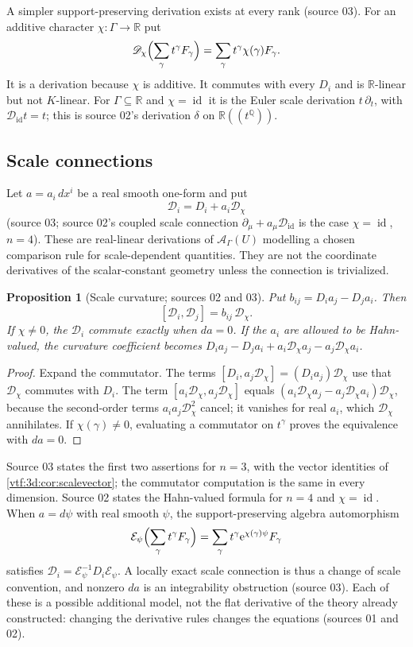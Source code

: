 \documentclass[11pt,letterpaper]{article}
\newtheorem{proposition}[theorem]{Proposition}
\theoremstyle{definition}
\theoremstyle{remark}
\newcommand{\R}{\mathbb R}\newcommand{\C}{\mathbb C}
\newcommand{\Q}{\mathbb Q}\newcommand{\N}{\mathbb N}\newcommand{\Z}{\mathbb Z}
\newcommand{\A}{\mathscr A}\newcommand{\OO}{\mathcal O}\newcommand{\mm}{\mathfrak m}
\newcommand{\id}{\operatorname{id}}\newcommand{\tr}{\operatorname{tr}}
\newcommand{\e}{\mathrm e}
\begin{document}
A simpler support-preserving derivation exists at every rank (source 03). For
an additive character $\chi:\Gamma\to\R$ put
\[
 \mathscr D_\chi\Bigl(\sum_\gamma t^\gamma F_\gamma\Bigr)
 =\sum_\gamma t^\gamma\chi(\gamma)F_\gamma.
\]
It is a derivation because $\chi$ is additive. It commutes with every $D_i$ and
is $\R$-linear but not $K$-linear. For $\Gamma\subseteq\R$ and $\chi=\id$ it is
the Euler scale derivation $t\,\partial_t$, with $\mathscr D_{\id}t=t$; this is
source 02's derivation $\delta$ on $\R((t^\Q))$.

\subsection{Scale connections}

Let $a=a_i\,dx^i$ be a real smooth one-form and put
\[
 \mathcal D_i=D_i+a_i\mathscr D_\chi
\]
(source 03; source 02's coupled scale connection $\partial_\mu+a_\mu\mathscr
D_{\id}$ is the case $\chi=\id$, $n=4$). These are real-linear derivations of
$\A_\Gamma(U)$ modelling a chosen comparison rule for scale-dependent
quantities. They are not the coordinate derivatives of the scalar-constant
geometry unless the connection is trivialized.

\begin{proposition}[Scale curvature; sources 02 and 03]\label{vtf:3d:prop:scale}
Put $b_{ij}=D_ia_j-D_ja_i$. Then
\[
 [\mathcal D_i,\mathcal D_j]=b_{ij}\,\mathscr D_\chi .
\]
If $\chi\ne0$, the $\mathcal D_i$ commute exactly when $da=0$. If the $a_i$ are
allowed to be Hahn-valued, the curvature coefficient becomes
$D_ia_j-D_ja_i+a_i\mathscr D_\chi a_j-a_j\mathscr D_\chi a_i$.
\end{proposition}
\begin{proof}
Expand the commutator. The terms $[D_i,a_j\mathscr D_\chi]=(D_ia_j)\mathscr
D_\chi$ use that $\mathscr D_\chi$ commutes with $D_i$. The term
$[a_i\mathscr D_\chi,a_j\mathscr D_\chi]$ equals
$(a_i\mathscr D_\chi a_j-a_j\mathscr D_\chi a_i)\mathscr D_\chi$, because the
second-order terms $a_ia_j\mathscr D_\chi^2$ cancel; it vanishes for real $a_i$,
which $\mathscr D_\chi$ annihilates. If $\chi(\gamma)\ne0$, evaluating a
commutator on $t^\gamma$ proves the equivalence with $da=0$.
\end{proof}

Source 03 states the first two assertions for $n=3$, with the vector identities
of \cref{vtf:3d:cor:scalevector}; the commutator computation is the same in every
dimension. Source 02 states the Hahn-valued formula for $n=4$ and $\chi=\id$.
When $a=d\psi$ with real smooth $\psi$, the support-preserving algebra
automorphism
\[
 \mathcal E_\psi\Bigl(\sum_\gamma t^\gamma F_\gamma\Bigr)
 =\sum_\gamma t^\gamma\e^{\chi(\gamma)\psi}F_\gamma
\]
satisfies $\mathcal D_i=\mathcal E_\psi^{-1}D_i\mathcal E_\psi$. A locally exact
scale connection is thus a change of scale convention, and nonzero $da$ is an
integrability obstruction (source 03). Each of these is a possible additional
model, not the flat derivative of the theory already constructed: changing the
derivative rules changes the equations (sources 01 and 02).
\end{document}
